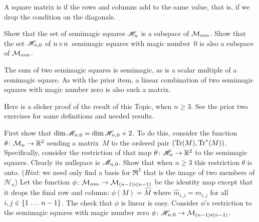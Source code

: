 \begin{exercises}
  \item A square matrix is  if 
     the rows and columns add to the same value, that is, if we drop the
     condition on the diagonals.
     \begin{exparts*}
       \partsitem
         Show that the set of semimagic squares $\mathscr{H}_n$ 
         is a subspace of $\mathcal{M}_{n \! \times \! n}$.
       \partsitem
         Show that 
         the set $\mathscr{H}_{n,0}$  
         of $n \! \times \! n$~semimagic squares with magic number~$0$
         is also a subspace of $\mathcal{M}_{n \! \times \! n}$.
     \end{exparts*}
     \begin{answer}
       \begin{exparts*}
         \partsitem
           The sum of two semimagic squares is semimagic, as is a scalar 
           multiple of a semimagic square.
         \partsitem
           As with the prior item, a linear combination of two semimagic
           squares with magic number zero is also such a matrix.
       \end{exparts*}
     \end{answer}
  \item 
    \cite{Beardon}
    Here is a slicker proof of the result of this Topic, when $n\geq 3$.
    See the prior two exercises for some definitions and needed results.
    \begin{exparts}
      \partsitem
        First show that 
        $\dim\mathscr{M}_{n,0}=\dim\mathscr{H}_{n,0}+2$.
        To do this, consider the function
        $\mbox{$\theta\colon \mathcal{M}_n\to \mathbb{R}^2$}$ sending a 
        matrix~$M$ to
        the ordered pair $(\operatorname{Tr}(M),\operatorname{Tr}^*(M))$.
        Specifically, consider the restriction of that map
        $\mbox{$\theta\colon \mathscr{H}_n\to \mathbb{R}^2$}$ to the semimagic squares.  
        Clearly its nullspace is $\mathscr{M}_{n,0}$.
        Show that when $n\geq 3$ this restriction $\theta$ is onto.
        (\textit{Hint:} we need only find a basis for 
           $\Re^2$ that is the
           image of two members of $\mathcal{H}_n$)  
      \partsitem
        Let the function $\mbox{$\phi\colon \mathcal{M}_{n \! \times \! n}\to \mathcal{M}_{(n-1) \! \times \! (n-1)}$}$
        be the identity map except that it 
        drops the final row and column: $\phi(M)=\hat{M}$ where 
        $\hat{m}_{i,j}=m_{i,j}$ for all $i,j\in\mbox{$\{1\,\ldots\, n-1\}$}$.
        The check that $\phi$ is linear is easy.
        Consider $\phi$'s restriction to the semimagic squares with 
        magic number zero
       $\mbox{$\phi\colon \mathscr{H}_{n,0}\to \mathcal{M}_{(n-1) \! \times \! (n-1)}$}$.

\end{exparts}
\end{exercises}
